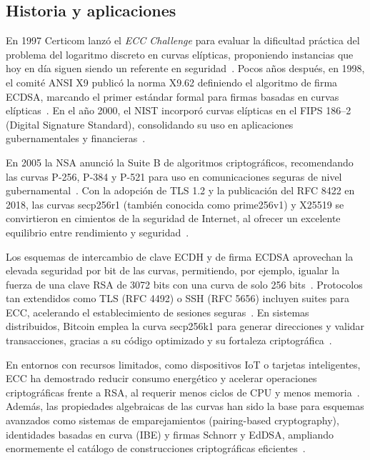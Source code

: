 \subsection{Historia y aplicaciones}\label{sec:historia_curvas_elipticas}
En 1997 Certicom lanzó el \emph{ECC Challenge} para evaluar la dificultad práctica del problema del logaritmo discreto en curvas elípticas, proponiendo instancias que hoy en día siguen siendo un referente en seguridad~\cite{gaudry2007breaking}. Pocos años después, en 1998, el comité ANSI X9 publicó la norma X9.62 definiendo el algoritmo de firma ECDSA, marcando el primer estándar formal para firmas basadas en curvas elípticas~\cite{ansi_x962_1998}. 
En el año 2000, el NIST incorporó curvas elípticas en el FIPS 186–2 (Digital Signature Standard), consolidando su uso en aplicaciones gubernamentales y financieras~\cite{nist_fips186_2}.

En 2005 la NSA anunció la Suite B de algoritmos criptográficos, recomendando las curvas P-256, P-384 y P-521 para uso en comunicaciones seguras de nivel gubernamental~\cite{rfc5430}. Con la adopción de TLS 1.2 y la publicación del RFC 8422 en 2018, las curvas secp256r1 (también conocida como prime256v1) y X25519 se convirtieron en cimientos de la seguridad de Internet, al ofrecer un excelente equilibrio entre rendimiento y seguridad~\cite{rfc8422}.

Los esquemas de intercambio de clave ECDH y de firma ECDSA aprovechan la elevada seguridad por bit de las curvas, permitiendo, por ejemplo, igualar la fuerza de una clave RSA de 3072 bits con una curva de solo 256 bits~\cite{hankerson2004guide}.
Protocolos tan extendidos como TLS (RFC 4492) o SSH (RFC 5656) incluyen suites para ECC, acelerando el establecimiento de sesiones seguras~\cite{rfc4492,rfc5656}. En sistemas distribuidos, Bitcoin emplea la curva secp256k1 para generar direcciones y validar transacciones, gracias a su código optimizado y su fortaleza criptográfica~\cite{wuille2017secp256k1}.

En entornos con recursos limitados, como dispositivos IoT o tarjetas inteligentes, ECC ha demostrado reducir consumo energético y acelerar operaciones criptográficas frente a RSA, al requerir menos ciclos de CPU y menos memoria~\cite{hodges2001implementing}. Además, las propiedades algebraicas de las curvas han sido la base para esquemas avanzados como sistemas de emparejamientos (pairing-based cryptography), identidades basadas en curva (IBE) y firmas Schnorr y EdDSA, ampliando enormemente el catálogo de construcciones criptográficas eficientes~\cite{boneh2001identity}.

